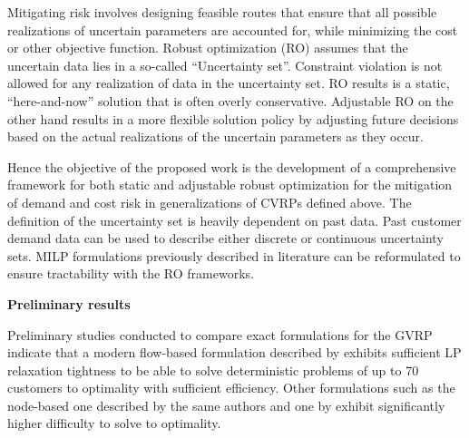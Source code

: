 \documentclass[letterpaper,12pt,onehalfspacing,twoside]{article}
\theoremstyle{msds}
\begin{document}
Mitigating risk involves designing feasible routes that ensure that all possible realizations of uncertain parameters are accounted for, while minimizing the cost or other objective function. Robust optimization (RO) assumes that the uncertain data lies in a so-called ``Uncertainty set''. Constraint violation is not allowed for any realization of data in the uncertainty set. RO results is a static, ``here-and-now'' solution that is often overly conservative. Adjustable RO \citep{gorissen} on the other hand results in a more flexible solution policy by adjusting future decisions based on the actual realizations of the uncertain parameters as they occur.

Hence the objective of the proposed work is the development of a comprehensive framework for both static and adjustable robust optimization for the mitigation of demand and cost risk in generalizations of CVRPs defined above. The definition of the uncertainty set is heavily dependent on past data. Past customer demand data can be used to describe either discrete or continuous uncertainty sets. MILP formulations previously described in literature \citep{POP201297, bektasKara} can be reformulated to ensure tractability with the RO frameworks.

\textbf{Preliminary results}

Preliminary studies conducted to compare exact formulations for the GVRP indicate that a modern flow-based formulation described by \citep{POP201297} exhibits sufficient LP relaxation tightness to be able to solve deterministic problems of up to 70 customers to optimality with sufficient efficiency. Other formulations such as the node-based one described by the same authors and one by \citep{bektasKara} exhibit significantly higher difficulty to solve to optimality.
\end{document}
